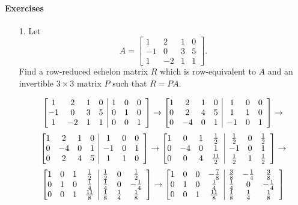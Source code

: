 \documentclass{article}
\makeatletter
\newenvironment{abmatrix}[2]
{
    \left[
        \begin{array} {@{} *{#1}{c} | *{#2}c @{}}
}
{
        \end{array}
    \right]
}
\makeatother
\begin{document}
\paragraph{Exercises}

\begin{enumerate}[listparindent=\parindent]
\item[1.] Let
    \[
        A = \begin{bmatrix}
            1 & 2 & 1 & 0 \\
            -1 & 0 & 3 & 5 \\
            1 & -2 & 1 & 1
        \end{bmatrix}.
    \]
    Find a row-reduced echelon matrix \(R\) which is row-equivalent to \(A\) and an invertible \(3 \times 3\) matrix \(P\) such that \(R = PA\).

\[
    \begin{abmatrix}{4}{4}
        1 & 2 & 1 & 0 & 1 & 0 & 0 \\
        -1 & 0 & 3 & 5 & 0 & 1 & 0 \\
        1 & -2 & 1 & 1 & 0 & 0 & 1
    \end{abmatrix}
    \rightarrow
    \begin{abmatrix}{4}{4}
        1 & 2 & 1 & 0 & 1 & 0 & 0 \\
        0 & 2 & 4 & 5 & 1 & 1 & 0 \\
        0 & -4 & 0 & 1 & -1 & 0 & 1
    \end{abmatrix}
    \rightarrow
\]
\[
    \begin{abmatrix}{4}{4}
        1 & 2 & 1 & 0 & 1 & 0 & 0 \\
        0 & -4 & 0 & 1 & -1 & 0 & 1 \\
        0 & 2 & 4 & 5 & 1 & 1 & 0
    \end{abmatrix}
    \rightarrow
    \begin{abmatrix}{4}{4}
        1 & 0 & 1 & \frac{1}{2} & \frac{1}{2} & 0 & \frac{1}{2} \\
        0 & -4 & 0 & 1 & -1 & 0 & 1 \\
        0 & 0 & 4 & \frac{11}{2} & \frac{1}{2} & 1 & \frac{1}{2}
    \end{abmatrix}
    \rightarrow
\]
\[
    \begin{abmatrix}{4}{4}
        1 & 0 & 1 & \frac{1}{2} & \frac{1}{2} & 0 & \frac{1}{2} \\
        0 & 1 & 0 & \frac{1}{4} & \frac{1}{4} & 0 & -\frac{1}{4} \\
        0 & 0 & 1 & \frac{11}{8} & \frac{1}{8} & \frac{1}{4} & \frac{1}{8}
    \end{abmatrix}
    \rightarrow
    \begin{abmatrix}{4}{4}
        1 & 0 & 0 & -\frac{7}{8} & \frac{3}{8} & -\frac{1}{4} & \frac{3}{8} \\
        0 & 1 & 0 & \frac{1}{4} & \frac{1}{4} & 0 & -\frac{1}{4} \\
        0 & 0 & 1 & \frac{11}{8} & \frac{1}{8} & \frac{1}{4} & \frac{1}{8}
    \end{abmatrix}
\]


\end{enumerate}
\end{document}
